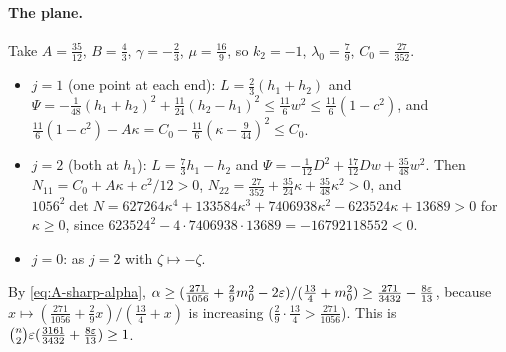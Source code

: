 \paragraph{The plane.} Take $A = \frac{35}{12}$, $B = \frac43$, $\gamma = -\frac23$, $\mu = \frac{16}{9}$,
so $k_2 = -1$, $\lambda_0 = \frac79$, $C_0 = \frac{27}{352}$.
\begin{itemize}
  \item $j = 1$ (one point at each end): $L = \frac23(h_1 + h_2)$ and
    $\Psi = -\frac{1}{48}(h_1 + h_2)^2 + \frac{11}{24}(h_2 - h_1)^2 \le \frac{11}{6}w^2 \le \frac{11}{6}(1 - c^2)$,
    and $\frac{11}{6}(1 - c^2) - A\kappa = C_0 - \frac{11}{6}(\kappa - \frac{9}{44})^2 \le C_0$.
  \item $j = 2$ (both at $h_1$): $L = \frac73h_1 - h_2$ and
    $\Psi = -\frac{1}{12}D^2 + \frac{17}{12}Dw + \frac{35}{48}w^2$. Then
    $N_{11} = C_0 + A\kappa + c^2/12 > 0$, $N_{22} = \frac{27}{352} + \frac{35}{24}\kappa + \frac{35}{48}\kappa^2 > 0$,
    and $1056^2\det N = 627264\kappa^4 + 133584\kappa^3 + 7406938\kappa^2 - 623524\kappa + 13689 > 0$ for
    $\kappa \ge 0$, since $623524^2 - 4 \cdot 7406938 \cdot 13689 = -16792118552 < 0$.
  \item $j = 0$: as $j = 2$ with $\zeta \mapsto -\zeta$.
\end{itemize}
By \eqref{eq:A-sharp-alpha}, $\alpha \ge (\frac{271}{1056} + \frac29m_0^2 - 2\varepsilon)/(\frac{13}{4} + m_0^2)
\ge \frac{271}{3432} - \frac{8\varepsilon}{13}$, because $x \mapsto (\frac{271}{1056} + \frac29x)/(\frac{13}{4} + x)$
is increasing ($\frac29 \cdot \frac{13}{4} > \frac{271}{1056}$). This is
$\binom n2\varepsilon(\frac{3161}{3432} + \frac{8\varepsilon}{13}) \ge 1$.

